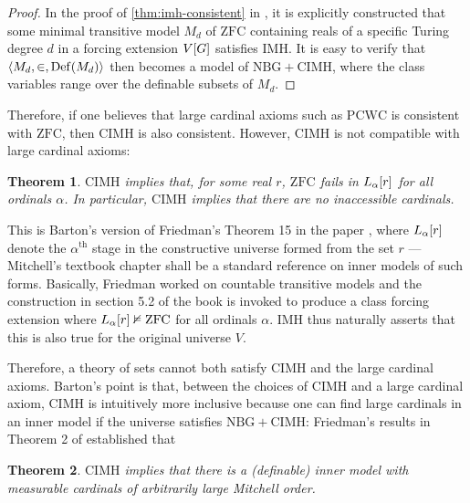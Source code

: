 \documentclass[12pt]{article}
\theoremstyle{plain}
\newtheorem{theorem}{Theorem}[section]
\theoremstyle{definition}
\newcommand{\ZFC}{\mathrm{ZFC}}
\newcommand{\NBG}{\mathrm{NBG}}
\newcommand{\IMH}{\mathrm{IMH}}
\newcommand{\CIMH}{\mathrm{CIMH}}
\newcommand{\PCWC}{\mathrm{PCWC}}
\DeclareMathOperator{\Def}{Def}
\begin{document}
\begin{proof}
	In the proof of \autoref{thm:imh-consistent} in \cite{friedman-imh-08}, it is explicitly constructed that some minimal transitive model $M_d$ of $\ZFC$ containing reals of a specific Turing degree $d$ in a forcing extension $V\mleft[G\mright]$ satisfies $\IMH$. It is easy to verify that $\left\langle M_d, \in, \Def\mleft(M_d\mright) \right\rangle$ then becomes a model of $\NBG + \CIMH$, where the class variables range over the definable subsets of $M_d$.
\end{proof}

Therefore, if one believes that large cardinal axioms such as $\PCWC$ is consistent with $\ZFC$, then $\CIMH$ is also consistent. However, $\CIMH$ is not compatible with large cardinal axioms:

\begin{theorem}
	\label{thm:cimh-no-inaccessibles}
	$\CIMH$ implies that, for some real $r$, $\ZFC$ fails in $L_\alpha\mleft[r\mright]$ for all ordinals $\alpha$. In particular, $\CIMH$ implies that there are no inaccessible cardinals.
\end{theorem}

This is Barton's version of Friedman's Theorem 15 in the paper \cite{friedman-imh-06}, where $L_\alpha\mleft[r\mright]$ denote the $\alpha^\text{th}$ stage in the constructive universe formed from the set $r$ --- Mitchell's textbook chapter \cite{mitchell-inner-model-theory} shall be a standard reference on inner models of such forms. Basically, Friedman worked on countable transitive models and the construction in section 5.2 of the book \cite{beller-coding-universe} is invoked to produce a class forcing extension where $L_\alpha\mleft[r\mright] \nvDash \ZFC$ for all ordinals $\alpha$. $\IMH$ thus naturally asserts that this is also true for the original universe $V$.

Therefore, a theory of sets cannot both satisfy $\CIMH$ and the large cardinal axioms. Barton's point is that, between the choices of $\CIMH$ and a large cardinal axiom, $\CIMH$ is intuitively more inclusive because one can find large cardinals in an inner model if the universe satisfies $\NBG + \CIMH$: Friedman's results in Theorem 2 of \cite{friedman-imh-08} established that

\begin{theorem}
	$\CIMH$ implies that there is a (definable) inner model with measurable cardinals of arbitrarily large Mitchell order.
\end{theorem}
\end{document}
